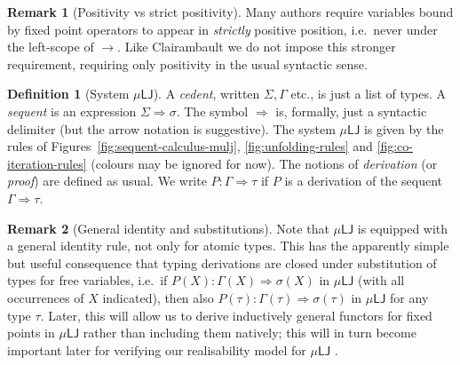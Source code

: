 \documentclass[10pt,a4paper]{amsart}
\theoremstyle{plain}
\theoremstyle{definition}
\newtheorem{defn}[defn]{Definition}
\newtheorem{remark}[remark]{Remark}
\newcommand{\anupam}[1]{\todo[color=green]{A: #1}}
\renewcommand{\todo}[1]{}
\renewcommand{\anupam}[1]{}
\theoremstyle{plain}
\theoremstyle{definition} %
\newcommand{\arrow}{\to}
\newcommand{\seqar}{\Rightarrow}
\newcommand{\LJ}{\mathsf{LJ}}
\newcommand{\muLJ}{\mu\LJ}
\newcommand{\der}{P}
\begin{document}
\begin{remark}
    [Positivity vs strict positivity]
    Many authors require variables bound by fixed point operators to appear in \emph{strictly} positive position, i.e.\ never under the left-scope of $\arrow$.
    Like Clairambault \cite{Clairambault09,Clairambault13interleaving} we do not impose this stronger requirement, requiring only positivity in the usual syntactic sense.
\end{remark}

\begin{defn}[System $\muLJ$]
A \emph{cedent}, written $\Sigma, \Gamma$ etc., is just a list of types. 
A \emph{sequent} is an expression $\Sigma \seqar \sigma$.
The symbol $\seqar$ is, formally, just a syntactic delimiter (but the arrow notation is suggestive).
The system $\muLJ$ is given by the rules of Figures~\ref{fig:sequent-calculus-mulj}, \ref{fig:unfolding-rules} and \ref{fig:co-iteration-rules} (colours may be ignored for now).
The notions of \emph{derivation} (or \emph{proof}) are defined as usual. 
We write $P: \Gamma \seqar \tau$ if $P$ is a derivation of the sequent $\Gamma \seqar \tau$. 
\end{defn}

\begin{remark}
    [General identity and substitutions]
    \label{rem:gen-identity+substitution}
    Note that $\muLJ$ is equipped with a general identity rule, not only for atomic types. 
    This has the apparently simple but useful consequence that typing derivations are closed under substitution of types for free variables, i.e.\ if $\der(X) : \Gamma(X) \seqar \sigma(X)$ in $\muLJ $ (with all occurrences of $X$ indicated), then also $\der(\tau) : \Gamma(\tau) \seqar \sigma(\tau)$ in $\muLJ$ for any type $\tau$.
    Later, this will allow us to derive inductively general functors for fixed points in $\muLJ$ rather than including them natively; this will in turn become important later for verifying our realisability model for $\muLJ$ \anupam{come back to this later, need to mention eta}.
\end{remark}
\end{document}
